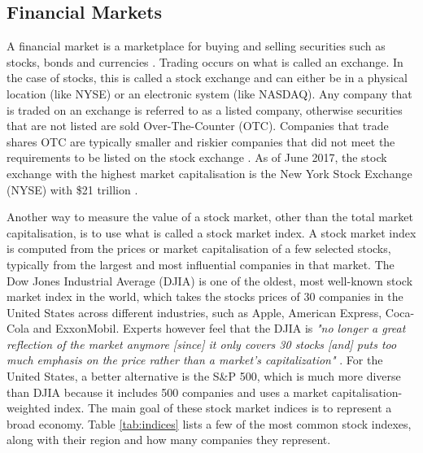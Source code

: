 \documentclass{UoYCSproject}
\begin{document}
\subsection{Financial Markets}
A financial market is a marketplace for buying and selling securities such as stocks, bonds and currencies \cite{financialmarket}. Trading occurs on what is called an exchange. In the case of stocks, this is called a stock exchange and can either be in a physical location (like NYSE) or an electronic system (like NASDAQ). Any company that is traded on an exchange is referred to as a listed company, otherwise securities that are not listed are sold Over-The-Counter (OTC). Companies that trade shares OTC are typically smaller and riskier companies that did not meet the requirements to be listed on the stock exchange \cite{stockexchange}. As of June 2017, the stock exchange with the highest market capitalisation is the New York Stock Exchange (NYSE) with \$21 trillion \cite{nyse}. 

Another way to measure the value of a stock market, other than the total market capitalisation, is to use what is called a stock market index. A stock market index is computed from the prices or market capitalisation of a few selected stocks, typically from the largest and most influential companies in that market. The Dow Jones Industrial Average (DJIA) is one of the oldest, most well-known stock market index in the world, which takes the stocks prices of 30 companies in the United States across different industries, such as Apple, American Express, Coca-Cola and ExxonMobil. Experts however feel that the DJIA is \textit{"no longer a great reflection of the market anymore [since] it only covers 30 stocks [and] puts too much emphasis on the price rather than a market's capitalization"} \cite{dowproblem}. For the United States, a better alternative is the S\&P 500, which is much more diverse than DJIA because it includes 500 companies and uses a market capitalisation-weighted index. The main goal of these stock market indices is to represent a broad economy. Table \ref{tab:indices} lists a few of the most common stock indexes, along with their region and how many companies they represent. 
\end{document}
